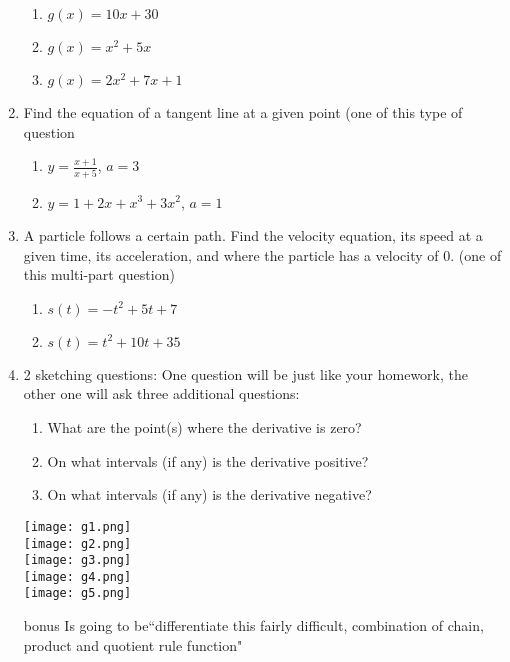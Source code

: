 \documentclass[12pt]{article}
\begin{document}
\begin{enumerate}
\begin{enumerate}
        \item $g(x)=10x+30$
        \item $g(x)=x^2+5x$
        \item $g(x)=2x^2+7x+1$
    \end{enumerate}
    \item Find the equation of a tangent line at a given point (one of this type of question
    \begin{enumerate}
    \item $y=\frac{x+1}{x+5}$, $a=3$
    \item $y=1+2x+x^3+3x^2$, $a=1$
    \end{enumerate}
    \item A particle follows a certain path. Find the velocity equation, its speed at a given time, its acceleration, and where the particle has a velocity of 0. (one of this multi-part question)
    \begin{enumerate}
        \item $s(t)=-t^2+5t+7$
        \item $s(t)=t^2+10t+35$
    \end{enumerate}
    \item 2 sketching questions: One question will be just like your homework, the other one will ask three additional questions: 
    \begin{enumerate}
        \item What are the point(s) where the derivative is zero?
        \item On what intervals (if any) is the derivative positive?
        \item On what intervals (if any) is the derivative negative?
    \end{enumerate}
    \texttt{[image: g1.png]}\\
    \texttt{[image: g2.png]}\\
    \texttt{[image: g3.png]}\\
    \texttt{[image: g4.png]}\\
    \texttt{[image: g5.png]}
    \item[bonus] Is going to be``differentiate this fairly difficult, combination of chain, product and quotient rule function"
\end{enumerate}
\end{document}
